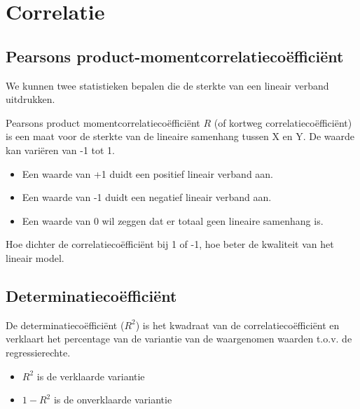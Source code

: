 \section{Correlatie}
\label{sec:correlatie}

\subsection{Pearsons product-momentcorrelatiecoëfficiënt}
We kunnen twee statistieken bepalen die de sterkte van een lineair verband uitdrukken.

\begin{definition}
   Pearsons product momentcorrelatiecoëfficiënt $R$ (of kortweg correlatiecoëfficiënt) is een maat voor de sterkte van de lineaire samenhang tussen X en Y. De waarde kan vari\"eren van -1 tot 1.

  \begin{itemize}
    \item Een waarde van +1 duidt een positief lineair verband aan.
    \item Een waarde van -1 duidt een negatief lineair verband aan.
    \item Een waarde van 0 wil zeggen dat er totaal geen lineaire samenhang is.
  \end{itemize}
  
  Hoe dichter de correlatiecoëfficiënt bij 1 of -1, hoe beter de kwaliteit van het lineair model.
\end{definition}

\subsection{Determinatieco\"effici\"ent}
\begin{definition}
  De determinatieco\"effici\"ent ($R^{2}$) is het kwadraat van de correlatieco\"effici\"ent en verklaart het percentage van de variantie van de waargenomen waarden t.o.v. de regressierechte.

  \begin{itemize}
    \item $R^{2}$ is de verklaarde variantie
    \item $1-R^{2}$ is de onverklaarde variantie
  \end{itemize}
\end{definition}

